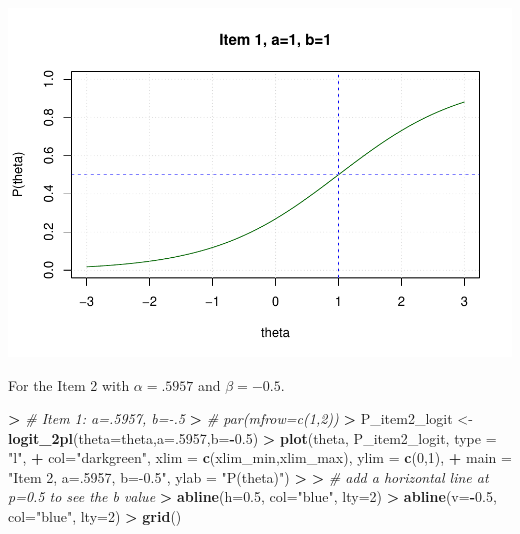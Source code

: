 \documentclass[
]{article}
\newenvironment{Shaded}{\begin{snugshade}}{\end{snugshade}}
\newcommand{\AttributeTok}[1]{\textcolor[rgb]{0.13,0.29,0.53}{#1}}
\newcommand{\CommentTok}[1]{\textcolor[rgb]{0.56,0.35,0.01}{\textit{#1}}}
\newcommand{\DecValTok}[1]{\textcolor[rgb]{0.00,0.00,0.81}{#1}}
\newcommand{\ErrorTok}[1]{\textcolor[rgb]{0.64,0.00,0.00}{\textbf{#1}}}
\newcommand{\FloatTok}[1]{\textcolor[rgb]{0.00,0.00,0.81}{#1}}
\newcommand{\FunctionTok}[1]{\textcolor[rgb]{0.13,0.29,0.53}{\textbf{#1}}}
\newcommand{\NormalTok}[1]{#1}
\newcommand{\OtherTok}[1]{\textcolor[rgb]{0.56,0.35,0.01}{#1}}
\newcommand{\SpecialCharTok}[1]{\textcolor[rgb]{0.81,0.36,0.00}{\textbf{#1}}}
\newcommand{\StringTok}[1]{\textcolor[rgb]{0.31,0.60,0.02}{#1}}
\begin{document}
\includegraphics{Assignment_1_files/figure-latex/unnamed-chunk-5-1.pdf}

For the Item 2 with \(\alpha=.5957\) and \(\beta=-0.5\).

\begin{Shaded}
\begin{Highlighting}[]
\SpecialCharTok{\textgreater{}} \CommentTok{\# Item 1: a=.5957, b={-}.5}
\ErrorTok{\textgreater{}} \CommentTok{\# par(mfrow=c(1,2))}
\ErrorTok{\textgreater{}}\NormalTok{ P\_item2\_logit }\OtherTok{\textless{}{-}} \FunctionTok{logit\_2pl}\NormalTok{(}\AttributeTok{theta=}\NormalTok{theta,}\AttributeTok{a=}\NormalTok{.}\DecValTok{5957}\NormalTok{,}\AttributeTok{b=}\SpecialCharTok{{-}}\FloatTok{0.5}\NormalTok{)}
\SpecialCharTok{\textgreater{}} \FunctionTok{plot}\NormalTok{(theta, P\_item2\_logit, }\AttributeTok{type =} \StringTok{"l"}\NormalTok{, }
\SpecialCharTok{+}      \AttributeTok{col=}\StringTok{"darkgreen"}\NormalTok{, }\AttributeTok{xlim =} \FunctionTok{c}\NormalTok{(xlim\_min,xlim\_max), }\AttributeTok{ylim =} \FunctionTok{c}\NormalTok{(}\DecValTok{0}\NormalTok{,}\DecValTok{1}\NormalTok{),}
\SpecialCharTok{+}      \AttributeTok{main =} \StringTok{"Item 2, a=.5957, b={-}0.5"}\NormalTok{, }\AttributeTok{ylab =} \StringTok{"P(theta)"}\NormalTok{)}
\SpecialCharTok{\textgreater{}} 
\ErrorTok{\textgreater{}} \CommentTok{\# add a horizontal line at p=0.5 to see the b value}
\ErrorTok{\textgreater{}} \FunctionTok{abline}\NormalTok{(}\AttributeTok{h=}\FloatTok{0.5}\NormalTok{, }\AttributeTok{col=}\StringTok{"blue"}\NormalTok{, }\AttributeTok{lty=}\DecValTok{2}\NormalTok{)}
\SpecialCharTok{\textgreater{}} \FunctionTok{abline}\NormalTok{(}\AttributeTok{v=}\SpecialCharTok{{-}}\FloatTok{0.5}\NormalTok{, }\AttributeTok{col=}\StringTok{"blue"}\NormalTok{, }\AttributeTok{lty=}\DecValTok{2}\NormalTok{)}
\SpecialCharTok{\textgreater{}} \FunctionTok{grid}\NormalTok{()}
\end{Highlighting}
\end{Shaded}
\end{document}
